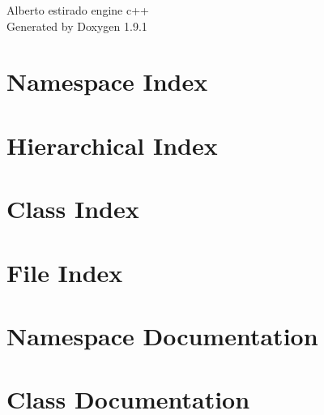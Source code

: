 \let\mypdfximage\pdfximage\def\pdfximage{\immediate\mypdfximage}\documentclass[twoside]{book}
\newcommand{\+}{\discretionary{\mbox{\scriptsize$\hookleftarrow$}}{}{}}
\newcommand{\clearemptydoublepage}{%
  \newpage{\pagestyle{empty}\cleardoublepage}%
}
\begin{document}
\raggedbottom

\hypersetup{pageanchor=false,
             bookmarksnumbered=true,
             pdfencoding=unicode
            }
\begin{titlepage}
\vspace*{7cm}
\begin{center}%
{\Large Alberto estirado engine c++ }\\
\vspace*{1cm}
{\large Generated by Doxygen 1.9.1}\\
\end{center}
\end{titlepage}
\clearemptydoublepage
{}
\tableofcontents
\clearemptydoublepage
{}
\hypersetup{pageanchor=true}

\chapter{Namespace Index}

\chapter{Hierarchical Index}

\chapter{Class Index}

\chapter{File Index}

\chapter{Namespace Documentation}


\chapter{Class Documentation}
































\end{document}
